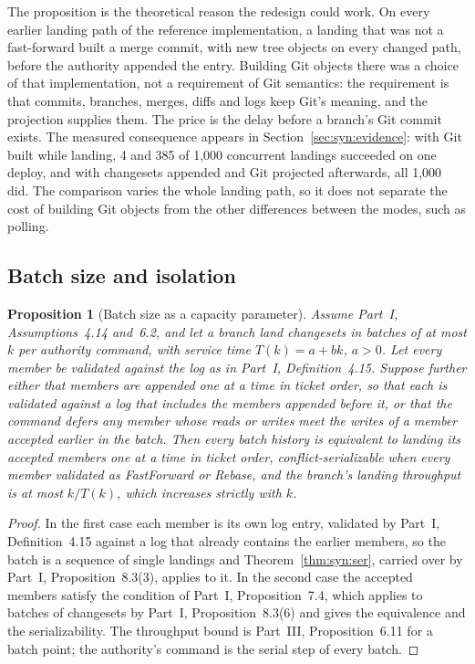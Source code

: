 \documentclass[11pt,letterpaper]{article}
\newtheorem{proposition}[theorem]{Proposition}
\theoremstyle{definition}
\theoremstyle{remark}
\begin{document}
The proposition is the theoretical reason the redesign could work. On every earlier landing path of the reference implementation, a landing that was not a fast-forward built a merge commit, with new tree objects on every changed path, before the authority appended the entry. Building Git objects there was a choice of that implementation, not a requirement of Git semantics: the requirement is that commits, branches, merges, diffs and logs keep Git's meaning, and the projection supplies them. The price is the delay before a branch's Git commit exists. The measured consequence appears in Section~\ref{sec:syn:evidence}: with Git built while landing, 4 and 385 of 1,000 concurrent landings succeeded on one deploy, and with changesets appended and Git projected afterwards, all 1,000 did. %
The comparison varies the whole landing path, so it does not separate the cost of building Git objects from the other differences between the modes, such as polling.

\subsection{Batch size and isolation}

\begin{proposition}[Batch size as a capacity parameter]
\label{prop:syn:batch}
Assume Part~I, Assumptions~4.14 and~6.2, and let a branch land changesets in batches of at most $k$ per authority command, with service time $T(k)=a+bk$, $a>0$. Let every member be validated against the log as in Part~I, Definition~4.15. Suppose further either that members are appended one at a time in ticket order, so that each is validated against a log that includes the members appended before it, or that the command defers any member whose reads or writes meet the writes of a member accepted earlier in the batch. Then every batch history is equivalent to landing its accepted members one at a time in ticket order, conflict-serializable when every member validated as FastForward or Rebase, and the branch's landing throughput is at most $k/T(k)$, which increases strictly with $k$.
\end{proposition}

\begin{proof}
In the first case each member is its own log entry, validated by Part~I, Definition~4.15 against a log that already contains the earlier members, so the batch is a sequence of single landings and Theorem~\ref{thm:syn:ser}, carried over by Part~I, Proposition~8.3(3), applies to it. In the second case the accepted members satisfy the condition of Part~I, Proposition~7.4, which applies to batches of changesets by Part~I, Proposition~8.3(6) and gives the equivalence and the serializability. The throughput bound is Part~III, Proposition~6.11 for a batch point; the authority's command is the serial step of every batch.
\end{proof}
\end{document}
